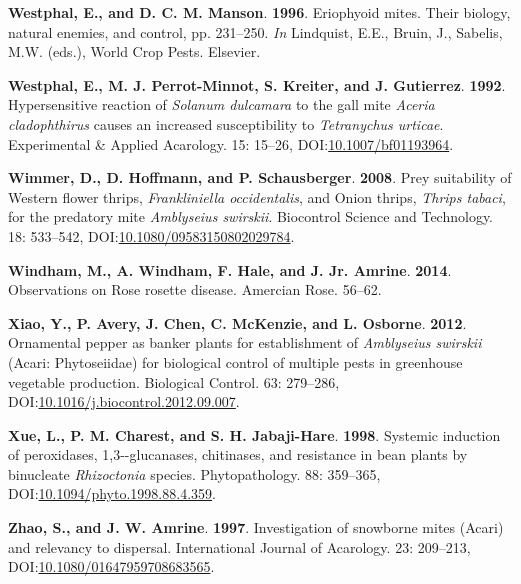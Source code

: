 \documentclass[12pt,final,CPage]{ufthesis}
\newlength{\cslhangindent}
\newenvironment{CSLReferences}[2] %
{%
	\setlength{\parindent}{0pt}
	\ifodd #1 \everypar{\setlength{\hangindent}{\cslhangindent}}\ignorespaces\fi
	\ifnum #2 > 0
	\setlength{\parskip}{#2\baselineskip}
	\fi
}%
{}
\begin{document}
{\begin{CSLReferences}{1}{0}
  \leavevmode{}%
  \textbf{Westphal, E., and D. C. M. Manson}. \textbf{1996}. Eriophyoid mites. Their biology, natural enemies, and control, pp. 231--250. \emph{In} Lindquist, E.E., Bruin, J., Sabelis, M.W. (eds.), World Crop Pests. Elsevier.

  \leavevmode{}%
  \textbf{Westphal, E., M. J. Perrot-Minnot, S. Kreiter, and J. Gutierrez}. \textbf{1992}. Hypersensitive reaction of {\emph{Solanum dulcamara}} to the gall mite {\emph{Aceria cladophthirus}} causes an increased susceptibility to {\emph{Tetranychus urticae}}. Experimental {\&} Applied Acarology. 15: 15--26, DOI:\href{https://doi.org/10.1007/bf01193964}{10.1007/bf01193964}.

  \leavevmode{}%
  \textbf{Wimmer, D., D. Hoffmann, and P. Schausberger}. \textbf{2008}. Prey suitability of {Western flower thrips}, {\emph{Frankliniella occidentalis}}, and {Onion thrips}, {\emph{Thrips tabaci}}, for the predatory mite {\emph{Amblyseius swirskii}}. Biocontrol Science and Technology. 18: 533--542, DOI:\href{https://doi.org/10.1080/09583150802029784}{10.1080/09583150802029784}.

  \leavevmode{}%
  \textbf{Windham, M., A. Windham, F. Hale, and J. Jr. Amrine}. \textbf{2014}. Observations on {Rose rosette disease}. Amercian Rose. 56--62.

  \leavevmode{}%
  \textbf{Xiao, Y., P. Avery, J. Chen, C. McKenzie, and L. Osborne}. \textbf{2012}. Ornamental pepper as banker plants for establishment of {\emph{Amblyseius swirskii}} ({Acari}: {Phytoseiidae}) for biological control of multiple pests in greenhouse vegetable production. Biological Control. 63: 279--286, DOI:\href{https://doi.org/10.1016/j.biocontrol.2012.09.007}{10.1016/j.biocontrol.2012.09.007}.

  \leavevmode{}%
  \textbf{Xue, L., P. M. Charest, and S. H. Jabaji-Hare}. \textbf{1998}. Systemic induction of peroxidases, 1,3-\textbeta-glucanases, chitinases, and resistance in bean plants by binucleate {\emph{Rhizoctonia}} species. Phytopathology{\textregistered}. 88: 359--365, DOI:\href{https://doi.org/10.1094/phyto.1998.88.4.359}{10.1094/phyto.1998.88.4.359}.

  \leavevmode{}%
  \textbf{Zhao, S., and J. W. Amrine}. \textbf{1997}. Investigation of snowborne mites ({Acari}) and relevancy to dispersal. International Journal of Acarology. 23: 209--213, DOI:\href{https://doi.org/10.1080/01647959708683565}{10.1080/01647959708683565}.


\end{CSLReferences}}
\end{document}
